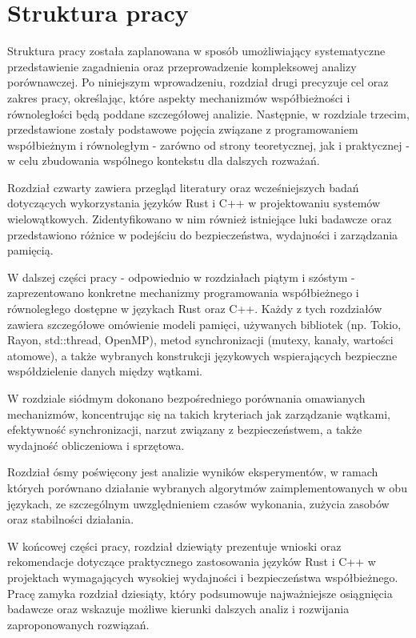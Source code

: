 \section{Struktura pracy}
Struktura pracy została zaplanowana w sposób umożliwiający systematyczne przedstawienie zagadnienia oraz przeprowadzenie kompleksowej analizy porównawczej. Po niniejszym wprowadzeniu, rozdział drugi precyzuje cel oraz zakres pracy, określając, które aspekty mechanizmów współbieżności i równoległości będą poddane szczegółowej analizie. Następnie, w rozdziale trzecim, przedstawione zostały podstawowe pojęcia związane z programowaniem współbieżnym i równoległym - zarówno od strony teoretycznej, jak i praktycznej - w celu zbudowania wspólnego kontekstu dla dalszych rozważań.

Rozdział czwarty zawiera przegląd literatury oraz wcześniejszych badań dotyczących wykorzystania języków Rust i C++ w projektowaniu systemów wielowątkowych. Zidentyfikowano w nim również istniejące luki badawcze oraz przedstawiono różnice w podejściu do bezpieczeństwa, wydajności i zarządzania pamięcią.

W dalszej części pracy - odpowiednio w rozdziałach piątym i szóstym - zaprezentowano konkretne mechanizmy programowania współbieżnego i równoległego dostępne w językach Rust oraz C++. Każdy z tych rozdziałów zawiera szczegółowe omówienie modeli pamięci, używanych bibliotek (np. Tokio, Rayon, std::thread, OpenMP), metod synchronizacji (mutexy, kanały, wartości atomowe), a także wybranych konstrukcji językowych wspierających bezpieczne współdzielenie danych między wątkami.

W rozdziale siódmym dokonano bezpośredniego porównania omawianych mechanizmów, koncentrując się na takich kryteriach jak zarządzanie wątkami, efektywność synchronizacji, narzut związany z bezpieczeństwem, a także wydajność obliczeniowa i sprzętowa.

Rozdział ósmy poświęcony jest analizie wyników eksperymentów, w ramach których porównano działanie wybranych algorytmów zaimplementowanych w obu językach, ze szczególnym uwzględnieniem czasów wykonania, zużycia zasobów oraz stabilności działania.

W końcowej części pracy, rozdział dziewiąty prezentuje wnioski oraz rekomendacje dotyczące praktycznego zastosowania języków Rust i C++ w projektach wymagających wysokiej wydajności i bezpieczeństwa współbieżnego. Pracę zamyka rozdział dziesiąty, który podsumowuje najważniejsze osiągnięcia badawcze oraz wskazuje możliwe kierunki dalszych analiz i rozwijania zaproponowanych rozwiązań.

